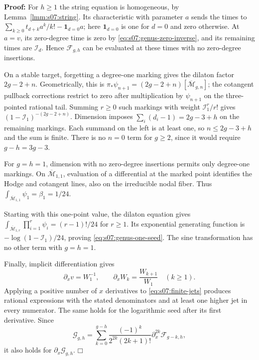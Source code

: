 \documentclass[a4paper,10pt]{article}
\numberwithin{equation}{section}
\newcommand{\MM}{\overline{\mathcal{M}}}
\theoremstyle{paperplain}
\theoremstyle{paperremark}
\theoremstyle{paperplain}
\newenvironment{prf}{\noindent \textbf{Proof: }}{\hfill $\mdlgwhtsquare$\par\addvspace{0.5\baselineskip}}
\begin{document}
\begin{prf}
For $h\geq1$ the string equation is homogeneous, by
Lemma~\ref{lmm:s07:string}. Its characteristic with parameter $a$
sends the times to
$\sum_{k\geq0}t_{d+k}a^k/k!-\mathbf1_{d=0}a$; here
$\mathbf1_{d=0}$ is one for $d=0$ and zero otherwise.
At $a=v$, its zero-degree time is zero by
\eqref{eq:s07:genus-zero-inverse}, and its remaining times are
$\mathcal I_d$. Hence $\mathcal F_{g,h}$ can be evaluated at these
times with no zero-degree insertions.

On a stable target, forgetting a degree-one marking gives the dilaton
factor $2g-2+n$. Geometrically, this is
$\pi_*\psi_{n+1}=(2g-2+n)[\MM_{g,n}]$; the cotangent pullback
corrections restrict to zero after multiplication by $\psi_{n+1}$
on the three-pointed rational tail. Summing $r\geq0$ such markings
with weight $\mathcal I_1^r/r!$ gives
$(1-\mathcal I_1)^{-(2g-2+n)}$. Dimension imposes
$\sum_i(d_i-1)=2g-3+h$ on the remaining markings. Each summand on
the left is at least one, so $n\leq2g-3+h$ and the sum is finite.
There is no $n=0$ term for $g\geq2$, since it would require
$g-h=3g-3$.

For $g=h=1$, dimension with no zero-degree insertions permits only
degree-one markings. On $\MM_{1,1}$, evaluation of a differential at
the marked point identifies the Hodge and cotangent lines, also on
the irreducible nodal fiber. Thus
$\int_{\MM_{1,1}}\psi_1=\beta_1=1/24$.

Starting with this one-point value, the dilaton equation gives
$\int_{\MM_{1,r}}\prod_{i=1}^r\psi_i=(r-1)!/24$ for $r\geq1$.
Its exponential generating function is
$-\log(1-\mathcal I_1)/24$, proving
\eqref{eq:s07:genus-one-seed}. The sine transformation has no
other term with $g=h=1$.

Finally, implicit differentiation gives
\begin{equation}\label{eq:s07:jet-x}
 \partial_xv=W_1^{-1},\qquad
 \partial_xW_k=\frac{W_{k+1}}{W_1}\quad(k\geq1).
\end{equation}
Applying a positive number of $x$ derivatives to
\eqref{eq:s07:finite-jets} produces rational expressions with the
stated denominators and at least one higher jet in every numerator.
The same holds for the logarithmic seed after its first derivative.
Since
\[
 \mathcal G_{g,h}
 =\sum_{k=0}^{g-h}\frac{(-1)^k}{2^{2k}(2k+1)!}
                           \partial_x^{2k}\mathcal F_{g-k,h},
\]
it also holds for $\partial_x\mathcal G_{g,h}$.
\end{prf}
\end{document}
